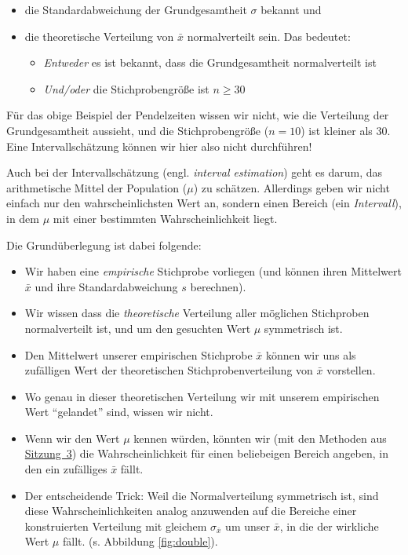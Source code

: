 \documentclass[
  11pt,
  ngerman,
  a4paper,
]{report}
\providecommand{\tightlist}{%
  \setlength{\itemsep}{0pt}\setlength{\parskip}{0pt}}
\begin{document}
\begin{itemize}
\tightlist
\item
  die Standardabweichung der Grundgesamtheit \(\sigma\) bekannt und
\item
  die theoretische Verteilung von \(\bar{x}\) normalverteilt sein. Das bedeutet:

  \begin{itemize}
  \tightlist
  \item
    \emph{Entweder} es ist bekannt, dass die Grundgesamtheit normalverteilt ist
  \item
    \emph{Und/oder} die Stichprobengröße ist \(n\geq30\)
  \end{itemize}
\end{itemize}

Für das obige Beispiel der Pendelzeiten wissen wir nicht, wie die Verteilung der Grundgesamtheit aussieht, und die Stichprobengröße (\(n=10\)) ist kleiner als 30. Eine Intervallschätzung können wir hier also nicht durchführen!

Auch bei der Intervallschätzung (engl. \emph{interval estimation}) geht es darum, das arithmetische Mittel der Population (\(\mu\)) zu schätzen. Allerdings geben wir nicht einfach nur den wahrscheinlichsten Wert an, sondern einen Bereich (ein \emph{Intervall}), in dem \(\mu\) mit einer bestimmten Wahrscheinlichkeit liegt.

Die Grundüberlegung ist dabei folgende:

\begin{itemize}
\tightlist
\item
  Wir haben eine \emph{empirische} Stichprobe vorliegen (und können ihren Mittelwert \(\bar{x}\) und ihre Standardabweichung \(s\) berechnen).
\item
  Wir wissen dass die \emph{theoretische} Verteilung aller möglichen Stichproben normalverteilt ist, und um den gesuchten Wert \(\mu\) symmetrisch ist.
\item
  Den Mittelwert unserer empirischen Stichprobe \(\bar{x}\) können wir uns als zufälligen Wert der theoretischen Stichprobenverteilung von \(\bar{x}\) vorstellen.
\item
  Wo genau in dieser theoretischen Verteilung wir mit unserem empirischen Wert \enquote{gelandet} sind, wissen wir nicht.
\item
  Wenn wir den Wert \(\mu\) kennen würden, könnten wir (mit den Methoden aus \protect\hyperlink{wahrscheinlichkeitsrechnung-mit-standardnormalverteilung}{Sitzung~3}) die Wahrscheinlichkeit für einen beliebeigen Bereich angeben, in den ein zufälliges \(\bar{x}\) fällt.
\item
  Der entscheidende Trick: Weil die Normalverteilung symmetrisch ist, sind diese Wahrscheinlichkeiten analog anzuwenden auf die Bereiche einer konstruierten Verteilung mit gleichem \(\sigma_{\bar{x}}\) um unser \(\bar{x}\), in die der wirkliche Wert \(\mu\) fällt. (s. Abbildung \ref{fig:double}).
\end{itemize}
\end{document}
